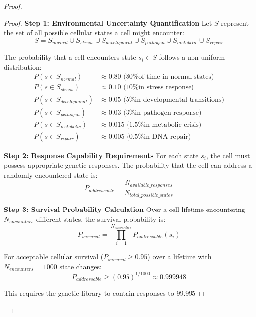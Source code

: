 \documentclass[12pt,a4paper]{article}
\begin{document}
\begin{proof}
\begin{proof}
\textbf{Step 1: Environmental Uncertainty Quantification}
Let $S$ represent the set of all possible cellular states a cell might encounter:
\begin{equation}
S = S_{normal} \cup S_{stress} \cup S_{development} \cup S_{pathogen} \cup S_{metabolic} \cup S_{repair}
\end{equation}

The probability that a cell encounters state $s_i \in S$ follows a non-uniform distribution:
\begin{align}
P(s \in S_{normal}) &\approx 0.80 \text{ (80\% of time in normal states)} \\
P(s \in S_{stress}) &\approx 0.10 \text{ (10\% in stress response)} \\
P(s \in S_{development}) &\approx 0.05 \text{ (5\% in developmental transitions)} \\
P(s \in S_{pathogen}) &\approx 0.03 \text{ (3\% in pathogen response)} \\
P(s \in S_{metabolic}) &\approx 0.015 \text{ (1.5\% in metabolic crisis)} \\
P(s \in S_{repair}) &\approx 0.005 \text{ (0.5\% in DNA repair)}
\end{align}

\textbf{Step 2: Response Capability Requirements}
For each state $s_i$, the cell must possess appropriate genetic responses. The probability that the cell can address a randomly encountered state is:
\begin{equation}
P_{addressable} = \frac{N_{available\_responses}}{N_{total\_possible\_states}}
\end{equation}

\textbf{Step 3: Survival Probability Calculation}
Over a cell lifetime encountering $N_{encounters}$ different states, the survival probability is:
\begin{equation}
P_{survival} = \prod_{i=1}^{N_{encounters}} P_{addressable}(s_i)
\end{equation}

For acceptable cellular survival ($P_{survival} \geq 0.95$) over a lifetime with $N_{encounters} = 1000$ state changes:
\begin{equation}
P_{addressable} \geq (0.95)^{1/1000} \approx 0.999948
\end{equation}

This requires the genetic library to contain responses to 99.995%


\end{proof}
\end{proof}
\end{document}
